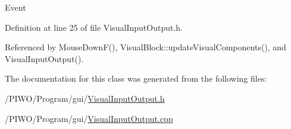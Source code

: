 Event 

Definition at line 25 of file VisualInputOutput.h.

Referenced by MouseDownF(), VisualBlock::updateVisualComponents(), and VisualInputOutput().

The documentation for this class was generated from the following files:\begin{CompactItemize}
\item 
/PIWO/Program/gui/\hyperlink{VisualInputOutput_8h}{VisualInputOutput.h}\item 
/PIWO/Program/gui/\hyperlink{VisualInputOutput_8cpp}{VisualInputOutput.cpp}\end{CompactItemize}
